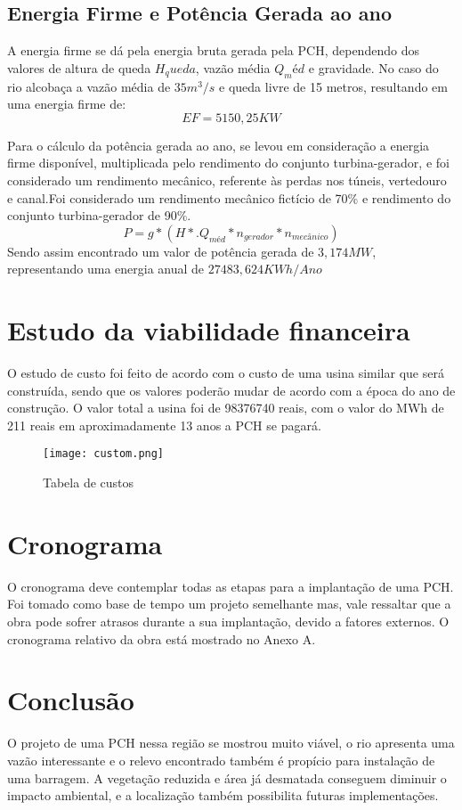 \section{Energia Firme e Potência Gerada ao ano}
A energia firme se dá pela energia bruta gerada pela PCH, dependendo dos valores de altura de queda $H_queda$, vazão média $Q_méd$ e gravidade. No caso do rio alcobaça a vazão média de $35 m^3/s$ e queda livre de 15 metros, resultando em uma energia firme de:
\begin{equation}
	EF = 5150,25 KW
\end{equation}

Para o cálculo da potência gerada ao ano, se levou em consideração a energia firme disponível, multiplicada pelo rendimento do conjunto turbina-gerador, e foi considerado um rendimento mecânico, referente às perdas nos túneis, vertedouro e canal.Foi considerado um rendimento mecânico fictício de 70\% e rendimento do conjunto turbina-gerador de 90\%.
\begin{equation}
P = g *(H*. Q_{méd} * n_{gerador} *n_{mecânico})
\end{equation}
Sendo assim encontrado um valor de potência gerada de $3,174MW$, representando uma energia anual de $27483,624 KWh/Ano$
\chapter{Estudo da viabilidade financeira}
O estudo de custo foi feito de acordo com o custo de uma usina similar que será construída, sendo que os valores poderão mudar de acordo com a época do ano de construção. O valor total a usina foi de 98376740 reais, com o valor do MWh de 211 reais em aproximadamente 13 anos a PCH se pagará.
\begin{figure}[h]
	\centering
	\texttt{[image: custom.png]}
	\caption{Tabela de custos}
	\label{fig:custo}
\end{figure}

\chapter{Cronograma}
O cronograma deve contemplar todas as etapas para a implantação de uma PCH. Foi tomado como base de tempo um projeto semelhante mas, vale ressaltar que a obra pode sofrer atrasos durante a sua implantação, devido a fatores externos. O cronograma relativo da obra está mostrado no Anexo A.

\chapter{Conclusão}
O projeto de uma PCH nessa região se mostrou muito viável, o rio apresenta uma vazão interessante e o relevo encontrado também é propício para instalação de uma barragem. A vegetação reduzida e área já desmatada conseguem diminuir o impacto ambiental, e a localização também possibilita futuras implementações.

